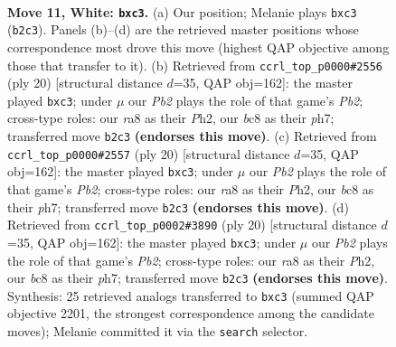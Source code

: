 \documentclass[11pt]{article}
\begin{document}
\clearpage

\begin{figure}[p]\centering
\begin{subfigure}{0.46\textwidth}\centering
\resizebox{\linewidth}{!}{%
\newchessgame
\chessboard[
  setfen={r1b1kb1r/ppp3p1/2n5/3q1p1p/3P4/2nB1N2/PP3PPP/R1BQ1RK1 w kq - 0 11},
  showmover=false,
  pgfstyle=straightmove, color=movearrow, markmove={b2-c3}
]}
\caption{}
\end{subfigure}\hfill
\begin{subfigure}{0.46\textwidth}\centering
\resizebox{\linewidth}{!}{%
\newchessgame
\chessboard[
  setfen={r1b2rk1/ppp1bppp/2n5/3q4/3P4/2nB1N2/PP3PPP/R1BQ1RK1 w - - 0 11},
  showmover=false,
  pgfstyle=straightmove, color=movearrow, markmove={b2-c3}
]}
\caption{}
\end{subfigure}
\\[4pt]
\begin{subfigure}{0.46\textwidth}\centering
\resizebox{\linewidth}{!}{%
\newchessgame
\chessboard[
  setfen={r1b2rk1/ppp1bppp/2n5/3q4/3P4/2nB1N2/PP3PPP/R1BQ1RK1 w - - 0 11},
  showmover=false,
  pgfstyle=straightmove, color=movearrow, markmove={b2-c3}
]}
\caption{}
\end{subfigure}\hfill
\begin{subfigure}{0.46\textwidth}\centering
\resizebox{\linewidth}{!}{%
\newchessgame
\chessboard[
  setfen={r1b2rk1/ppp1bppp/2n5/3q4/3P4/2nB1N2/PP3PPP/R1BQ1RK1 w - - 0 11},
  showmover=false,
  pgfstyle=straightmove, color=movearrow, markmove={b2-c3}
]}
\caption{}
\end{subfigure}
\caption{\textbf{Move 11, White: \texttt{bxc3}.} (a) Our position; Melanie plays \texttt{bxc3} (\texttt{b2c3}). Panels (b)--(d) are the retrieved master positions whose correspondence most drove this move (highest QAP objective among those that transfer to it). (b) Retrieved from \texttt{ccrl\_top\_p0000\#2556} (ply 20) [structural distance $d$=35, QAP obj=162]: the master played \texttt{bxc3}; under $\mu$ our \emph{Pb2} plays the role of that game's \emph{Pb2}; cross-type roles: our \emph{r}a8 as their \emph{P}h2, our \emph{b}c8 as their \emph{p}h7; transferred move \texttt{b2c3} \textbf{(endorses this move)}. (c) Retrieved from \texttt{ccrl\_top\_p0000\#2557} (ply 20) [structural distance $d$=35, QAP obj=162]: the master played \texttt{bxc3}; under $\mu$ our \emph{Pb2} plays the role of that game's \emph{Pb2}; cross-type roles: our \emph{r}a8 as their \emph{P}h2, our \emph{b}c8 as their \emph{p}h7; transferred move \texttt{b2c3} \textbf{(endorses this move)}. (d) Retrieved from \texttt{ccrl\_top\_p0002\#3890} (ply 20) [structural distance $d$=35, QAP obj=162]: the master played \texttt{bxc3}; under $\mu$ our \emph{Pb2} plays the role of that game's \emph{Pb2}; cross-type roles: our \emph{r}a8 as their \emph{P}h2, our \emph{b}c8 as their \emph{p}h7; transferred move \texttt{b2c3} \textbf{(endorses this move)}. Synthesis: 25 retrieved analogs transferred to \texttt{bxc3} (summed QAP objective 2201, the strongest correspondence among the candidate moves); Melanie committed it via the \texttt{search} selector.}
\label{fig:thought-m20}
\end{figure}
\end{document}
